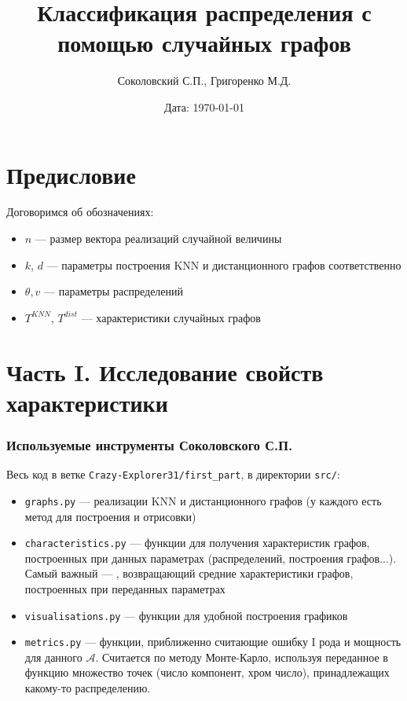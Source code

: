 \documentclass[a4paper,12pt]{article}
\title{\textbf{Классификация распределения с помощью случайных графов}}
\author{Соколовский С.П., Григоренко М.Д.}
\date{Дата: \today}
\begin{document}
\maketitle

\section{Предисловие}
Договоримся об обозначениях: \begin{itemize}
    \item $n$ --- размер вектора реализаций случайной величины
    \item $k$, $d$ --- параметры построения KNN и дистанционного графов соответственно
    \item $\theta, v$ --- параметры распределений
    \item $T^{KNN}$, $T^{dist}$ --- характеристики случайных графов
\end{itemize}

\section{Часть I. Исследование свойств характеристики}
\subsubsection*{Используемые инструменты Соколовского С.П.}
Весь код в ветке \texttt{Crazy-Explorer31/first\_part}, в директории \texttt{src/}:
\begin{itemize}
    \item \texttt{graphs.py} --- реализации KNN и дистанционного графов (у каждого есть метод для построения и отрисовки)
    \item \texttt{characteristics.py} --- функции для получения характеристик графов, построенных при данных параметрах (распределений, построения графов...). Самый важный --- , возвращающий средние характеристики графов, построенных при переданных параметрах
    \item \texttt{visualisations.py} --- функции для удобной построения графиков
    \item \texttt{metrics.py} --- функции, приближенно считающие ошибку I рода и мощность для данного $\mathcal{A}$. Считается по методу Монте-Карло, используя переданное в функцию множество точек (число компонент, хром число), принадлежащих какому-то распределению.
\end{itemize}
\end{document}
